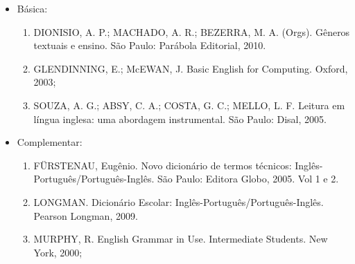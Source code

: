 \begin{itemize} 

\item Básica:
    \begin{enumerate}

    \item DIONISIO, A. P.; MACHADO, A. R.; BEZERRA, M. A. (Orgs). Gêneros textuais e ensino. São Paulo: Parábola Editorial, 2010.
    
    \item GLENDINNING, E.; McEWAN, J. Basic English for Computing. Oxford, 2003;
    
    \item SOUZA, A. G.; ABSY, C. A.; COSTA, G. C.; MELLO, L. F. Leitura em língua inglesa: uma abordagem instrumental. São Paulo: Disal, 2005.
	
    \end{enumerate}

\item Complementar:
	\begin{enumerate} 

    \item FÜRSTENAU, Eugênio. Novo dicionário de termos técnicos: Inglês-Português/Português-Inglês. São Paulo: Editora Globo, 2005. Vol 1 e 2.

    \item LONGMAN. Dicionário Escolar: Inglês-Português/Português-Inglês. Pearson Longman, 2009.

    \item MURPHY, R. English Grammar in Use. Intermediate Students. New York, 2000;

	\end{enumerate}

\end{itemize}
